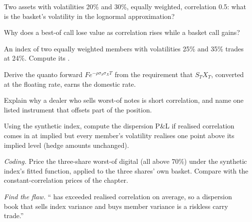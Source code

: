 \begin{exercise}[$\star$]\label{exo:dv:multi-asset-options:1}
Two assets with volatilities 20\% and 30\%, equally weighted, correlation 0.5: what is the basket's volatility in the lognormal
approximation?
\end{exercise}

\begin{exercise}[$\star$]\label{exo:dv:multi-asset-options:2}
Why does a best-of call lose value as correlation rises while a basket call gains?
\end{exercise}

\begin{exercise}[$\star$]\label{exo:dv:multi-asset-options:3}
An index of two equally weighted members with volatilities 25\% and 35\% trades at 24\%. Compute its .
\end{exercise}

\begin{exercise}[$\star\star$]\label{exo:dv:multi-asset-options:4}
Derive the quanto forward $Fe^{-\rho\sigma_S\sigma_XT}$ from the requirement that $S_TX_T$, converted at the floating rate,
earns the domestic rate.
\end{exercise}

\begin{exercise}[$\star\star$]\label{exo:dv:multi-asset-options:5}
Explain why a dealer who sells worst-of notes is short correlation, and name one listed instrument that offsets part of the
position.
\end{exercise}

\begin{exercise}[$\star\star$]\label{exo:dv:multi-asset-options:6}
Using the synthetic index, compute the dispersion P\&L if realised correlation comes in at implied but every member's volatility
realises one point above its implied level (hedge amounts unchanged).
\end{exercise}

\begin{exercise}[$\star\star\star$]\label{exo:dv:multi-asset-options:7}
\emph{Coding.} Price the three-share worst-of digital (all above 70\%) under the synthetic index's fitted 
function, applied to the three shares' own basket. Compare with the constant-correlation prices of the chapter.
\end{exercise}

\begin{exercise}[$\star\star\star$]\label{exo:dv:multi-asset-options:8}
\emph{Find the flaw.} `` has exceeded realised correlation on average, so a dispersion book that sells index
variance and buys member variance is a riskless carry trade.''
\end{exercise}

